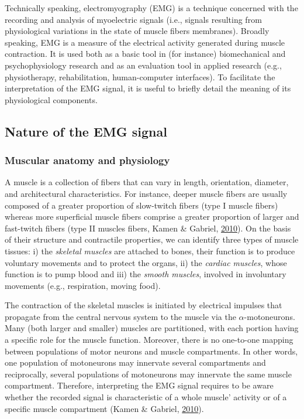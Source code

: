 \documentclass[a4paper,12pt,twoside,onecolumn,openright,final,oldfontcommands]{memoir}
\begin{document}
Technically speaking, electromyography (EMG) is a technique concerned with the recording and analysis of myoelectric signals (i.e., signals resulting from physiological variations in the state of muscle fibers membranes). Broadly speaking, EMG is a measure of the electrical activity generated during muscle contraction. It is used both as a basic tool in (for instance) biomechanical and psychophysiology research and as an evaluation tool in applied research (e.g., physiotherapy, rehabilitation, human-computer interfaces). To facilitate the interpretation of the EMG signal, it is useful to briefly detail the meaning of its physiological components.

\hypertarget{nature-of-the-emg-signal}{%
\subsection{Nature of the EMG signal}\label{nature-of-the-emg-signal}}

\hypertarget{muscular-anatomy-and-physiology}{%
\subsubsection{Muscular anatomy and physiology}\label{muscular-anatomy-and-physiology}}

A muscle is a collection of fibers that can vary in length, orientation, diameter, and architectural characteristics. For instance, deeper muscle fibers are usually composed of a greater proportion of slow-twitch fibers (type I muscle fibers) whereas more superficial muscle fibers comprise a greater proportion of larger and fast-twitch fibers (type II muscles fibers, Kamen \& Gabriel, \protect\hyperlink{ref-kamen_essentials_2010}{2010}). On the basis of their structure and contractile properties, we can identify three types of muscle tissues: i) the \emph{skeletal muscles} are attached to bones, their function is to produce voluntary movements and to protect the organs, ii) the \emph{cardiac muscles}, whose function is to pump blood and iii) the \emph{smooth muscles}, involved in involuntary movements (e.g., respiration, moving food).

The contraction of the skeletal muscles is initiated by electrical impulses that propagate from the central nervous system to the muscle via the \(\alpha\)-motoneurons. Many (both larger and smaller) muscles are partitioned, with each portion having a specific role for the muscle function. Moreover, there is no one-to-one mapping between populations of motor neurons and muscle compartments. In other words, one population of motoneurons may innervate several compartments and reciprocally, several populations of motoneurons may innervate the same muscle compartment. Therefore, interpreting the EMG signal requires to be aware whether the recorded signal is characteristic of a whole muscle' activity or of a specific muscle compartment (Kamen \& Gabriel, \protect\hyperlink{ref-kamen_essentials_2010}{2010}).
\end{document}
